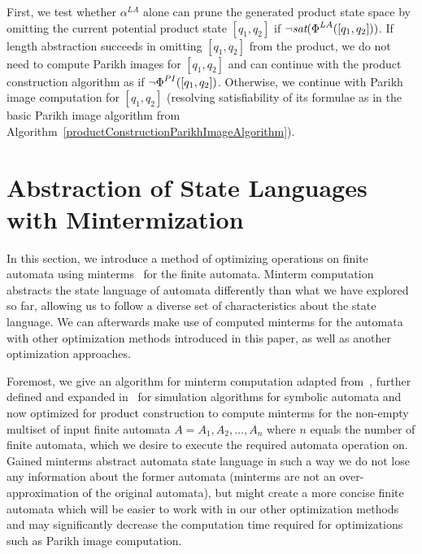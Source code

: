 First, we test whether $\alpha^{LA}$ alone can prune the generated product state space by omitting the current potential product state $[q_1, q_2]$ if $\neg \emph{sat}(\emph{$\Phi$}^{LA}([q_1, q_2]))$. If length abstraction succeeds in omitting $[q_1, q_2]$ from the product, we do not need to compute Parikh images for $[q_1, q_2]$ and can continue with the product construction algorithm as if $\neg \emph{$\Phi$}^{PI}([q_1, q_2])$. Otherwise, we continue with Parikh image computation for $[q_1, q_2]$ (resolving satisfiability of its formulae as in the basic Parikh image algorithm from Algorithm~\ref{productConstructionParikhImageAlgorithm}).


\section{Abstraction of State Languages with Mintermization}

In this section, we introduce a method of optimizing operations on finite automata using minterms~\cite{minterms-10.1007/978-3-642-18275-4_18} for the finite automata. Minterm computation abstracts the state language of automata differently than what we have explored so far, allowing us to follow a diverse set of characteristics about the state language. We can afterwards make use of computed minterms for the automata with other optimization methods introduced in this paper, as well as another optimization approaches.

Foremost, we give an algorithm for minterm computation adapted from~\cite{minterm_computation-Dantoni2014MinimizationOS}, further defined and expanded in~\cite{minterms_forms-FITPUB11801} for simulation algorithms for symbolic automata and now optimized for product construction to compute minterms for the non-empty multiset of input finite automata $A = {A_1, A_2, \dots, A_n}$ where $n$ equals the number of finite automata, which we desire to execute the required automata operation on. Gained minterms abstract automata state language in such a way we do not lose any information about the former automata (minterms are not an over-approximation of the original automata), but might create a more concise finite automata which will be easier to work with in our other optimization methods and may significantly decrease the computation time required for optimizations such as Parikh image computation.


